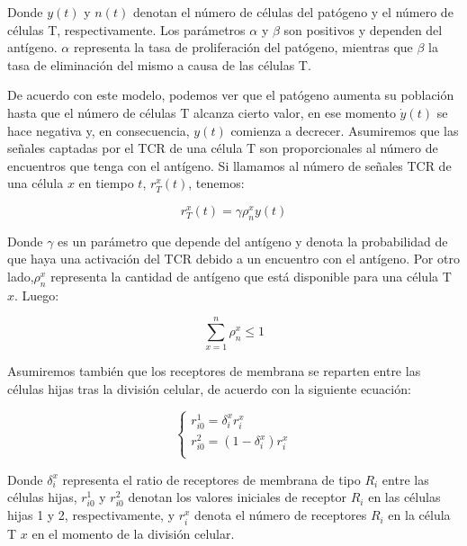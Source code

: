 Donde $y(t)$ y $n(t)$ denotan el número de células del patógeno y el número de células T, respectivamente. Los parámetros $\alpha$ y $\beta$ son positivos y dependen del antígeno. $\alpha$ representa la tasa de proliferación del patógeno, mientras que $\beta$ la tasa de eliminación del mismo a causa de las células T.

De acuerdo con este modelo, podemos ver que el patógeno aumenta su población hasta que el número de células T alcanza cierto valor, en ese momento $\dot{y}(t)$ se hace negativa y, en consecuencia, $y(t)$ comienza a decrecer. Asumiremos que las señales captadas por el TCR de una célula T son proporcionales al número de encuentros que tenga con el antígeno. Si llamamos al número de señales TCR de una célula $x$ en tiempo $t$, $r_{T}^{x}(t)$, tenemos:

\begin{equation}
	r_{T}^{x}(t) = \gamma\rho_{n}^{x}y(t)
\end{equation}

Donde $\gamma$ es un parámetro que depende del antígeno y denota la probabilidad de que haya una activación del TCR debido a un encuentro con el antígeno. Por otro lado,$\rho_{n}^{x}$ representa la cantidad de antígeno que está disponible para una célula T $x$. Luego:

\begin{equation}
	\sum_{x=1}^{n} \rho_{n}^{x} \leq 1
\end{equation}
	
Asumiremos también que los receptores de membrana se reparten entre las células hijas tras la división celular, de acuerdo con la siguiente ecuación:

\begin{equation}
	\left\{ \begin{array}{l}
	r_{i0}^{1}= \delta_{i}^{x} r_{i}^{x}\\
	r_{i0}^{2}= (1-\delta_{i}^{x}) r_{i}^{x} \\
	\end{array}
	\right.
\end{equation}


Donde $\delta_{i}^{x}$ representa el ratio de receptores de membrana de tipo $R_{i}$ entre las células hijas, $r_{i0}^{1}$ y $r_{i0}^{2}$ denotan los valores iniciales de receptor $R_{i}$ en las células hijas 1 y 2, respectivamente, y  $r_{i}^{x}$ denota el número de receptores $R_{i}$ en la célula T $x$ en el momento de la división celular.